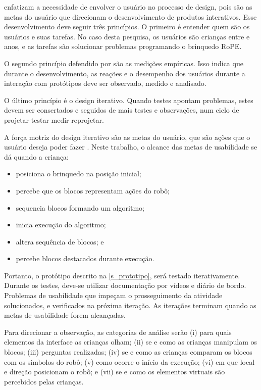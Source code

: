  enfatizam a necessidade de envolver o usuário no processo de design, pois são as metas do usuário que direcionam o desenvolvimento de produtos interativos. Esse desenvolvimento deve seguir três princípios. O primeiro é entender quem são os usuários e suas tarefas. No caso desta pesquisa, os usuários são crianças entre \idadeinicial e \idadefinal anos, e as tarefas são solucionar problemas programando o brinquedo RoPE. 

O segundo princípio defendido por  são as medições empíricas. Isso indica que durante o desenvolvimento, as reações e o desempenho dos usuários durante a interação com protótipos deve ser observado, medido e analisado. 

O último princípio é o design iterativo. Quando testes apontam problemas, estes devem ser consertados e seguidos de mais testes e observações, num ciclo de projetar-testar-medir-reprojetar. 

A força motriz do design iterativo são as metas do usuário, que são ações que o usuário deseja poder fazer \cite{rogers_design_2013}. Neste trabalho, o alcance das metas de usabilidade se dá quando a criança:

\begin{itemize}
    \item posiciona o brinquedo na posição inicial;
    \item percebe que os blocos representam ações do robô;
    \item sequencia blocos formando um algoritmo;
    \item inicia execução do algoritmo;
    \item altera sequência de blocos; e
    \item percebe blocos destacados durante execução.
\end{itemize}

Portanto, o protótipo descrito na \autoref{s_prototipo}, será testado iterativamente. Durante os testes, deve-se utilizar documentação por vídeos e diário de bordo. Problemas de usabilidade que impeçam o prosseguimento da atividade  solucionados, e verificados na próxima iteração. As iterações terminam quando as metas de usabilidade forem alcançadas.

Para direcionar a observação, as categorias de análise serão (i) 
para quais elementos da interface as crianças olham;
(ii) se e como as crianças manipulam os blocos; (iii) perguntas realizadas; (iv) se e como as crianças comparam os blocos com os símbolos do robô; (v) como ocorre o início da execução; (vi) em que local e direção posicionam o robô; e (vii) se e como os elementos virtuais são percebidos pelas crianças.

